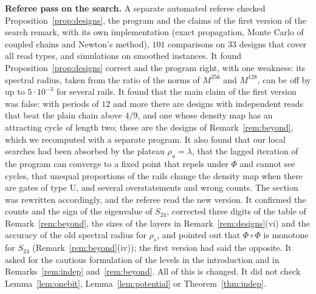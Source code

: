 \documentclass[11pt]{amsart}
\theoremstyle{definition}
\theoremstyle{remark}
\begin{document}
\medskip\noindent\textbf{Referee pass on the search.} A separate automated referee checked
Proposition~\ref{prop:designs}, the program and the claims of the first version of the search
remark, with its own implementation (exact propagation, Monte Carlo of coupled chains and Newton's
method), $101$ comparisons on $33$ designs that cover all read types, and simulations on smoothed
instances. It found Proposition~\ref{prop:designs} correct and the program right, with one
weakness: its spectral radius, taken from the ratio of the norms of $M^{256}$ and $M^{128}$, can be
off by up to $5\cdot10^{-3}$ for several rails. It found that the main claim of the first version
was false: with periods of $12$ and more there are designs with independent reads that beat the
plain chain above $4/9$, and one whose density map has an attracting cycle of length two; these
are the designs of Remark~\ref{rem:beyond}, which we recomputed with a separate program. It also
found that our local searches had been absorbed by the plateau $\rho_u=\lambda$, that the lagged
iteration of the program can converge to a fixed point that repels under $\Phi$ and cannot see
cycles, that unequal proportions of the rails change the density map when there are gates of type
$\mathrm U$, and several overstatements and wrong counts. The section was rewritten accordingly,
and the referee read the new version. It confirmed the counts and the sign of the eigenvalue of
$S_{24}$, corrected three digits of the table of Remark~\ref{rem:beyond}, the sizes of the layers
in Remark~\ref{rem:designs}(vi) and the accuracy of the old spectral radius for $\rho_s$, and
pointed out that $\Phi\circ\Phi$ is monotone for $S_{24}$ (Remark~\ref{rem:beyond}(iv)); the
first version had said the opposite. It asked for the cautious formulation of the levels in the
introduction and in Remarks~\ref{rem:indep} and~\ref{rem:beyond}. All of this is changed. It did not
check Lemma~\ref{lem:onebit}, Lemma~\ref{lem:potential} or Theorem~\ref{thm:indep}.
\end{document}
